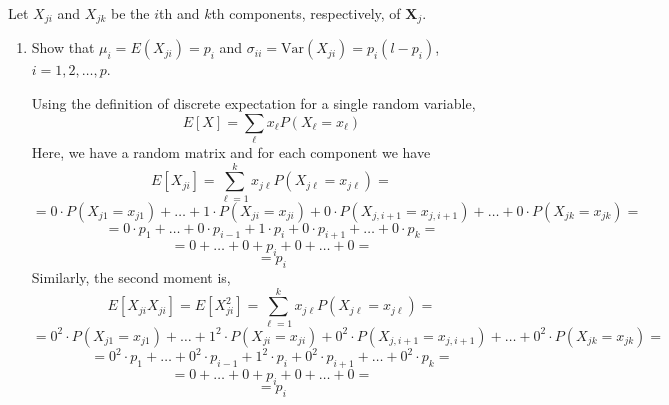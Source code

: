 Let $X_{ji}$ and $X_{jk}$ be the $i$th and $k$th components, respectively, of $\textbf{X}_{j}$.
\begin{enumerate}[label= (\alph*)]
    \item Show that $\mu_{i} = E(X_{ji}) = p_{i}$ and $\sigma_{ii} = \text{Var}(X_{ji}) = p_{i}(l - p_{i})$, $i = 1, 2, \dots, p$.
    
    Using the definition of discrete expectation for a single random variable,
    \[
        E[X] = \sum_{\ell}x_{\ell}P(X_{\ell} = x_{\ell})
    \]
    Here, we have a random matrix and for each component we have
    \[
        E[X_{ji}]
        =
        \sum_{\ell=1}^{k}x_{j\ell}P(X_{j\ell} = x_{j\ell})
        =
    \]
    \[{\scriptstyle 
        =
        0 \cdot P(X_{j1} = x_{j1}) + \dots + 1 \cdot P(X_{ji} = x_{ji}) + 0 \cdot P(X_{j,i+1} = x_{j,i+1}) + \dots + 0 \cdot P(X_{jk} = x_{jk})
        =
    }
    \]
    \[
        =
        0 \cdot p_{1} + \dots + 0 \cdot p_{i-1} + 1 \cdot p_{i} + 0 \cdot p_{i+1} + \dots + 0 \cdot p_{k}
        =
    \]
    \[
        =
        0 + \dots + 0 + p_{i} + 0 + \dots + 0
        =
    \]
    \[
        =
        p_{i}
    \]
    Similarly, the second moment is,
    \[
        E[X_{ji}X_{ji}]
        =
        E[X_{ji}^{2}]
        =
        \sum_{\ell=1}^{k}x_{j\ell}P(X_{j\ell} = x_{j\ell})
        =
    \]
    \[{\scriptstyle 
        =
        0^{2} \cdot P(X_{j1} = x_{j1}) + \dots + 1^{2} \cdot P(X_{ji} = x_{ji}) + 0^{2} \cdot P(X_{j,i+1} = x_{j,i+1}) + \dots + 0^{2} \cdot P(X_{jk} = x_{jk})
        =
    }
    \]
    \[
        =
        0^{2} \cdot p_{1} + \dots + 0^{2} \cdot p_{i-1} + 1^{2} \cdot p_{i} + 0^{2} \cdot p_{i+1} + \dots + 0^{2} \cdot p_{k}
        =
    \]
    \[
        =
        0 + \dots + 0 + p_{i} + 0 + \dots + 0
        =
    \]
    \[
        =
        p_{i}
    \]


\end{enumerate}
